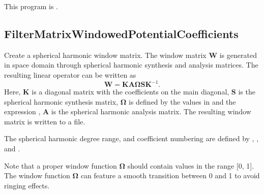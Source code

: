 This program is .
\clearpage
\subsection{FilterMatrixWindowedPotentialCoefficients}\label{FilterMatrixWindowedPotentialCoefficients}
Create a spherical harmonic window matrix. The window matrix $\mathbf{W}$ is generated in space domain through
spherical harmonic synthesis and analysis matrices.
The resulting linear operator can be written as
\begin{equation}
\mathbf{W} = \mathbf{K} \mathbf{A} \mathbf{\Omega} \mathbf{S} \mathbf{K}^{-1}.
\end{equation}
Here, $\mathbf{K}$ is a diagonal matrix with the  coefficients on the main diagonal,
$\mathbf{S}$ is the spherical harmonic synthesis matrix, $\mathbf{\Omega}$ is defined by the values in
 and the
expression , $\mathbf{A}$ is the spherical harmonic analysis matrix.
The resulting window matrix is written to a  file.

The spherical harmonic degree range, and coefficient numbering are defined by
, , and .

Note that a proper window function $\mathbf{\Omega}$ should contain values in the range [0, 1].
The window function $\mathbf{\Omega}$ can feature a smooth transition between 0 and 1 to avoid ringing effects.


